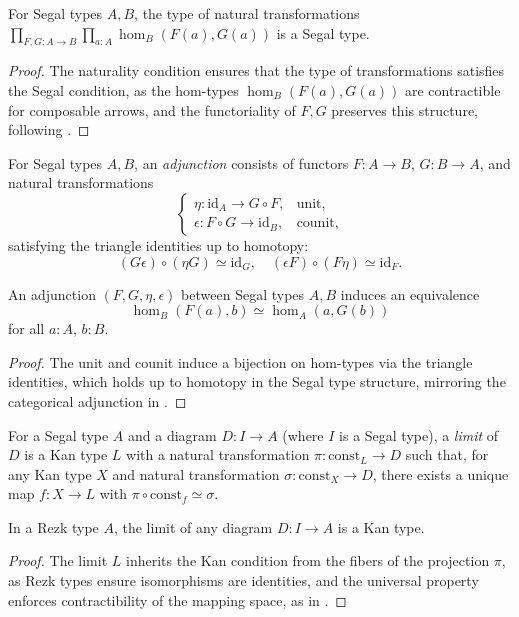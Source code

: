 \documentclass{article}
\begin{document}
\begin{theorem}
For Segal types $A, B$, the type of natural transformations $\prod_{F, G : A \to B} \prod_{a : A} \operatorname{hom}_B(F(a), G(a))$ is a Segal type.
\end{theorem}
\begin{proof}
The naturality condition ensures that the type of transformations satisfies the Segal condition, as the hom-types $\operatorname{hom}_B(F(a), G(a))$ are contractible for composable arrows, and the functoriality of $F, G$ preserves this structure, following \cite{Rez01}.
\end{proof}

\begin{definition}
For Segal types $A, B$, an \emph{adjunction} consists of functors $F : A \to B$, $G : B \to A$, and natural transformations
$$
\begin{cases}
\eta : \text{id}_A \to G \circ F, & \text{unit}, \\
\epsilon : F \circ G \to \text{id}_B, & \text{counit},
\end{cases}
$$
satisfying the triangle identities up to homotopy:
\[
(G \epsilon) \circ (\eta G) \simeq \text{id}_G, \quad (\epsilon F) \circ (F \eta) \simeq \text{id}_F.
\]
\end{definition}

\begin{theorem}
An adjunction $(F, G, \eta, \epsilon)$ between Segal types $A, B$ induces an equivalence
\[
\operatorname{hom}_B(F(a), b) \simeq \operatorname{hom}_A(a, G(b))
\]
for all $a : A$, $b : B$.
\end{theorem}
\begin{proof}
The unit and counit induce a bijection on hom-types via the triangle identities, which holds up to homotopy in the Segal type structure, mirroring the categorical adjunction in \cite{JT06}.
\end{proof}

\begin{definition}
For a Segal type $A$ and a diagram $D : I \to A$ (where $I$ is a Segal type), a \emph{limit} of $D$ is a Kan type $L$ with a natural transformation $\pi : \text{const}_L \to D$ such that, for any Kan type $X$ and natural transformation $\sigma : \text{const}_X \to D$, there exists a unique map $f : X \to L$ with $\pi \circ \text{const}_f \simeq \sigma$.
\end{definition}

\begin{theorem}
In a Rezk type $A$, the limit of any diagram $D : I \to A$ is a Kan type.
\end{theorem}
\begin{proof}
The limit $L$ inherits the Kan condition from the fibers of the projection $\pi$, as Rezk types ensure isomorphisms are identities, and the universal property enforces contractibility of the mapping space, as in \cite{Shu15}.
\end{proof}
\end{document}
